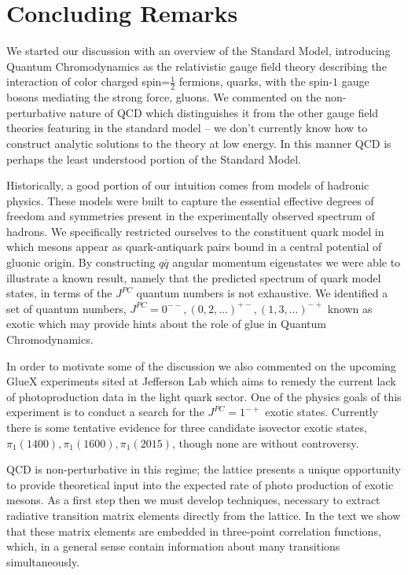 \chapter{Concluding Remarks} \label{chap::conclusion}
We started our discussion with an overview of the Standard Model, introducing Quantum Chromodynamics as the relativistic gauge field theory describing the interaction of color charged spin=$\frac{1}{2}$ fermions, quarks, with the spin-$1$ gauge bosons mediating the strong force, gluons. We commented on the non-perturbative nature of QCD which distinguishes it from the other gauge field theories featuring in the standard model -- we don't currently know how to construct analytic solutions to the theory at low energy.  In this manner QCD is perhaps the least understood portion of the Standard Model. 

Historically, a good portion of our intuition comes from models of hadronic physics. These models were built to capture the essential effective degrees of freedom and symmetries present in the experimentally observed spectrum of hadrons. We specifically restricted ourselves to the constituent quark model in which mesons appear as quark-antiquark pairs bound in a central potential of gluonic origin. By constructing $q\bar{q}$ angular momentum eigenstates we were able to illustrate a known result, namely that the predicted spectrum of quark model states, in terms of the $J^{PC}$ quantum numbers is not exhaustive. We identified a set of quantum numbers, $J^{PC} = 0^{--}, (0,2,\ldots)^{+-}, (1,3,\ldots)^{-+}$ known as exotic which may provide hints about the role of glue in Quantum Chromodynamics. 

In order to motivate some of the discussion we also commented on the upcoming GlueX experiments sited at Jefferson Lab which aims to remedy the current lack of photoproduction data in the light quark sector. One of the physics goals of this experiment is to conduct a search for the $J^{PC} =1^{-+}$ exotic states. Currently there is some tentative evidence for three candidate isovector exotic states, $\pi_1(1400), \pi_1(1600), \pi_1(2015)$, though none are without controversy. 

QCD is non-perturbative in this regime; the lattice presents a unique opportunity to provide theoretical input into the expected rate of photo production of exotic mesons. As a first step then we must develop techniques, necessary to extract radiative transition matrix elements directly from the lattice. In the text we show that these matrix elements are embedded in three-point correlation functions, which, in a general sense contain information about many transitions simultaneously. 

